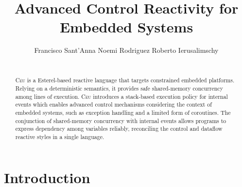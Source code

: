 \documentclass{acm_proc_article-sp}
\newcommand{\CEU}{\textsc{C\'{e}u}\xspace}
\newcommand{\1}{\;}
\newcommand{\2}{\;\;}
\newcommand{\3}{\;\;\;}
\newcommand{\5}{\;\;\;\;\;}
\begin{document}
\title {
    Advanced Control Reactivity for Embedded Systems
}

\author{
    \alignauthor
    Francisco Sant'Anna \hspace{1cm} Noemi Rodriguez \hspace{1cm} Roberto Ierusalimschy   \\
     \\
}

\maketitle

\begin{abstract}
\CEU is a Esterel-based reactive language that targets constrained embedded 
platforms.
%
Relying on a deterministic semantics, it provides safe shared-memory 
concurrency among lines of execution.
%
\CEU introduces a stack-based execution policy for internal events which 
enables advanced control mechanisms considering the context of embedded 
systems, such as exception handling and a limited form of coroutines.
%
The conjunction of shared-memory concurrency with internal events allows 
programs to express dependency among variables reliably, reconciling the 
control and dataflow reactive styles in a single language.
%
\end{abstract}




\section{Introduction}
\end{document}
